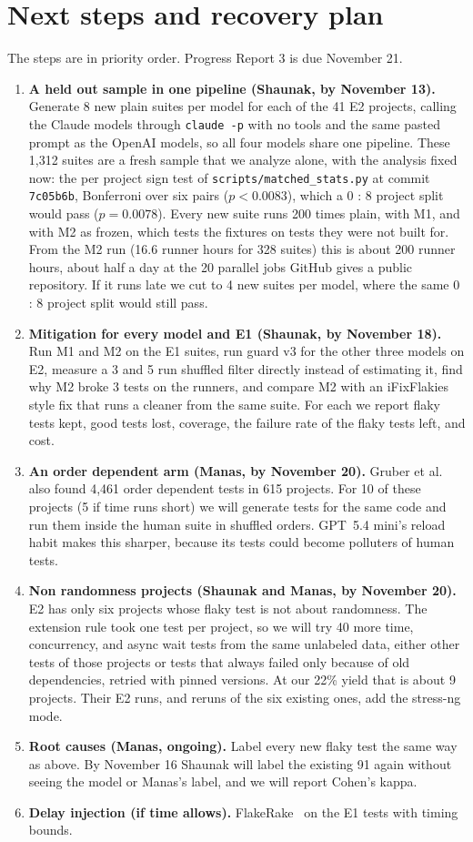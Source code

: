 \documentclass[sigconf,nonacm]{acmart}
\begin{document}
\section{Next steps and recovery plan}
\label{sec:next}
The steps are in priority order. Progress Report 3 is due November 21.
\begin{enumerate}
\item \textbf{A held out sample in one pipeline (Shaunak, by November 13).} Generate 8 new plain suites per model for each of the 41 E2 projects, calling the Claude models through \texttt{claude -p} with no tools and the same pasted prompt as the OpenAI models, so all four models share one pipeline. These 1,312 suites are a fresh sample that we analyze alone, with the analysis fixed now: the per project sign test of \texttt{scripts/matched\_stats.py} at commit \texttt{7c05b6b}, Bonferroni over six pairs ($p < 0.0083$), which a 0 : 8 project split would pass ($p = 0.0078$). Every new suite runs 200 times plain, with M1, and with M2 as frozen, which tests the fixtures on tests they were not built for. From the M2 run (16.6 runner hours for 328 suites) this is about 200 runner hours, about half a day at the 20 parallel jobs GitHub gives a public repository. If it runs late we cut to 4 new suites per model, where the same 0 : 8 project split would still pass.
\item \textbf{Mitigation for every model and E1 (Shaunak, by November 18).} Run M1 and M2 on the E1 suites, run guard v3 for the other three models on E2, measure a 3 and 5 run shuffled filter directly instead of estimating it, find why M2 broke 3 tests on the runners, and compare M2 with an iFixFlakies style fix that runs a cleaner from the same suite. For each we report flaky tests kept, good tests lost, coverage, the failure rate of the flaky tests left, and cost.
\item \textbf{An order dependent arm (Manas, by November 20).} Gruber et al.~\cite{gruber2021} also found 4,461 order dependent tests in 615 projects. For 10 of these projects (5 if time runs short) we will generate tests for the same code and run them inside the human suite in shuffled orders. GPT~5.4 mini's reload habit makes this sharper, because its tests could become polluters of human tests.
\item \textbf{Non randomness projects (Shaunak and Manas, by November 20).} E2 has only six projects whose flaky test is not about randomness. The extension rule took one test per project, so we will try 40 more time, concurrency, and async wait tests from the same unlabeled data, either other tests of those projects or tests that always failed only because of old dependencies, retried with pinned versions. At our 22\% yield that is about 9 projects. Their E2 runs, and reruns of the six existing ones, add the stress-ng mode.
\item \textbf{Root causes (Manas, ongoing).} Label every new flaky test the same way as above. By November 16 Shaunak will label the existing 91 again without seeing the model or Manas's label, and we will report Cohen's kappa.
\item \textbf{Delay injection (if time allows).} FlakeRake~\cite{rahman2024} on the E1 tests with timing bounds.
\end{enumerate}
\end{document}
